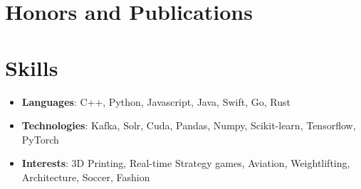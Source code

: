 \documentclass[letterpaper,11pt]{article}
\newcommand{\resumeItem}[2]{
  \item\small{
    \textbf{#1}{: #2\vspace{-2pt}}
  }
}
\newcommand{\resumeSubItem}[2]{\resumeItem{#1}{#2}\vspace{-3.8pt}}
\newcommand{\resumeSubHeadingListStart}{\begin{itemize}[leftmargin=*]}
\newcommand{\resumeSubHeadingListEnd}{\end{itemize}}
\begin{document}
\section{Honors and Publications}
  \resumeSubHeadingListStart
  \iftoggle{Finance}{
    \resumeSubItem{MIT IEEE}{Paper on detecting Parkinson's diseases using handwriting samples and recurrent neural networks}
    \resumeSubItem{IOI}{Qualified for Indian National Olympiad in Informatics: programming contest for selecting India's IOI team}
    \resumeSubItem{Jane Street SEE}{Among 32 students selected nationally for quant education program, played electronic trading games, attended lectures on Bayesian thinking, market-making, arbitrage, biases}
    \resumeSubItem{D.E. Shaw Nexus Fellowship}{Selected for sophomore fellowship program of about 30 students nationally}
    \resumeSubItem{Natural Sciences Waiver}{highly competitive scholarship awarded to $<$10 students out of 12,000 undergraduates}
    \resumeSubItem{ASES Stanford}{Winner, Enterpreneurship summit organized by ASES Stanford University}
  }{
    \resumeSubItem{D.E. Shaw Nexus Fellowship}{Selected for sophomore fellowship program of about 30 students nationally}
    \resumeSubItem{IOI}{Qualified for Indian National Olympiad in Informatics: programming contest for selecting India's IOI team}
    \resumeSubItem{MIT IEEE}{Paper on detecting Parkinson's diseases using handwriting samples and recurrent neural networks}
    \resumeSubItem{ASES Stanford}{Winner, Enterpreneurship summit organized by ASES Stanford University}
    \resumeSubItem{Natural Sciences Waiver}{highly competitive scholarship awarded to $<$10 students out of 12,000 undergraduates}
  }
  \resumeSubHeadingListEnd


\section{Skills}
 \resumeSubHeadingListStart
  \resumeSubItem{Languages}{C++, Python, Javascript, Java, Swift, Go, Rust}
  \resumeSubItem{Technologies}{Kafka, Solr, Cuda, Pandas, Numpy, Scikit-learn, Tensorflow, PyTorch}
  \resumeSubItem{Interests}{3D Printing, Real-time Strategy games, Aviation, Weightlifting, Architecture, Soccer, Fashion}
 \resumeSubHeadingListEnd


\end{document}
